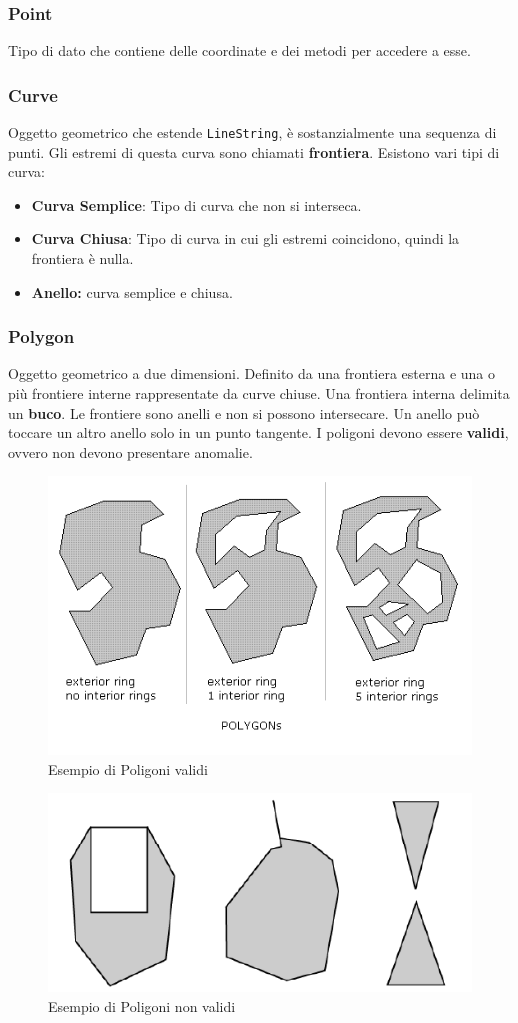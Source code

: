 \documentclass[a4paper,12pt]{article}
\begin{document}
\subsubsection{Point}
Tipo di dato che contiene delle coordinate e dei metodi per accedere a esse.

\subsubsection{Curve}
Oggetto geometrico che estende \texttt{LineString}, è sostanzialmente una sequenza di punti. Gli estremi di questa curva sono chiamati \textbf{frontiera}. Esistono vari tipi di curva:
\begin{itemize}
\item  \textbf{Curva Semplice}: Tipo di curva che non si interseca.
\item \textbf{Curva Chiusa}: Tipo di curva in cui gli estremi coincidono, quindi la frontiera è nulla.
\item \textbf{Anello:} curva semplice e chiusa.
\end{itemize}

\subsubsection{Polygon}
Oggetto geometrico a due dimensioni. Definito da una frontiera esterna e una o più frontiere interne rappresentate da curve chiuse. Una frontiera interna delimita un \textbf{buco}. Le frontiere sono anelli e non si possono intersecare. Un anello può toccare un altro anello solo in un punto tangente. I poligoni devono essere \textbf{validi}, ovvero non devono presentare anomalie.

\begin{figure}[H]
	\centering
	\includegraphics[width=0.5\linewidth]{Immagini/PoliVal}
	\caption{Esempio di Poligoni validi}
\end{figure}

\begin{figure}[H]
	\centering
	\includegraphics[width=0.5\linewidth]{Immagini/PoliNVal}
	\caption{Esempio di Poligoni non validi}
\end{figure}
\end{document}
